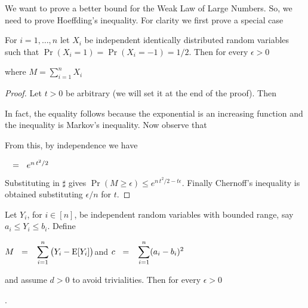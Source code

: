 \documentclass[sputnik.tex]{subfiles}
\begin{document}
We want to prove a better bound for the Weak Law of Large Numbers. So, we need to prove Hoeffding's inequality. For clarity we first prove a special case 


\begin{lemma}\label{Chernoff}
For $i=1,\dots,n$ let $X_i$ be independent identically distributed random variables such that\/ $\Pr(X_i{=}1)=\Pr(X_i{=}{-}1)=1/2$.
Then for every $\epsilon>0$

\hfill where $\displaystyle M=\sum^n_{i=1}X_i$
\end{lemma}
\begin{proof}
Let $t>0$ be arbitrary (we will set it at the end of the proof).
Then



In fact, the equality follows because the exponential is an increasing function and the inequality is Markov's inequality.
Now observe that






From this, by independence we have 

$\medrel{=}e^{n\,t^2/2}$

Substituting in $\sharp$ gives $\Pr(M\ge\epsilon)\le e^{n\,t^2/2-t\epsilon}$.
Finally Chernoff's inequality is obtained substituting $\epsilon/n$ for $t$.
\end{proof}


\begin{void_thm}\label{Chebyshev}
Let $Y_i$, for $i\in[n]$, be independent random variables with bounded range, say $a_i\le Y_i\le b_i$.
Define

\hfil$\displaystyle M\medrel{=}\sum^n_{i=1}\big(Y_i-{\rm E}[Y_i]\big)$\hfil and \hfil $\displaystyle c\medrel{=}\sum^n_{i=1}(a_i-b_i)^2$

and assume $d>0$ to avoid trivialities. Then for every $\epsilon>0$ 

.
\end{void_thm}
\end{document}
